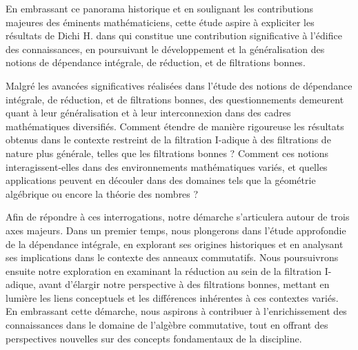 En embrassant ce panorama historique et en soulignant les contributions majeures des éminents mathématiciens, cette étude aspire à expliciter les résultats de Dichi H. dans \cite{Di2} qui constitue une contribution significative à l'édifice des connaissances, en poursuivant le développement et la généralisation des notions de dépendance intégrale, de réduction, et de filtrations bonnes.

Malgré les avancées significatives réalisées dans l'étude des notions de dépendance intégrale, de réduction, et de filtrations bonnes, des questionnements demeurent quant à leur généralisation et à leur interconnexion dans des cadres mathématiques diversifiés. Comment étendre de manière rigoureuse les résultats obtenus dans le contexte restreint de la filtration I-adique à des filtrations de nature plus générale, telles que les filtrations bonnes ? Comment ces notions interagissent-elles dans des environnements mathématiques variés, et quelles applications peuvent en découler dans des domaines tels que la géométrie algébrique ou encore la théorie des nombres ? 

Afin de répondre à ces interrogations, notre démarche s'articulera autour de trois axes majeurs. Dans un premier temps, nous plongerons dans l'étude approfondie de la dépendance intégrale, en explorant ses origines historiques et en analysant ses implications dans le contexte des anneaux commutatifs. Nous poursuivrons ensuite notre exploration en examinant la réduction au sein de la filtration I-adique, avant d'élargir notre perspective à des filtrations bonnes, mettant en lumière les liens conceptuels et les différences inhérentes à ces contextes variés. En embrassant cette démarche, nous aspirons à contribuer à l'enrichissement des connaissances dans le domaine de l'algèbre commutative, tout en offrant des perspectives nouvelles sur des concepts fondamentaux de la discipline.


